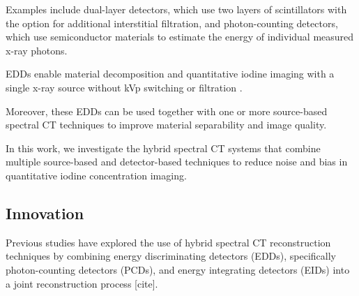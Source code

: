 \documentclass[12pt]{article}
\begin{document}
Examples include dual-layer detectors, which use two layers of scintillators with the option for additional interstitial filtration, and photon-counting detectors, which use semiconductor materials to estimate the energy of individual measured x-ray photons.


EDDs enable material decomposition and quantitative iodine imaging with a single x-ray source without kVp switching or filtration . 


Moreover, these EDDs can be used together with one or more source-based spectral CT techniques to improve material separability and image quality. 


In this work, we investigate the hybrid spectral CT systems that combine multiple source-based and detector-based techniques to reduce noise and bias in quantitative iodine concentration imaging.


\subsection{Innovation}
\label{subsec:intro_innovation}





Previous studies have explored the use of hybrid spectral CT reconstruction techniques by combining energy discriminating detectors (EDDs), specifically photon-counting detectors (PCDs), and energy integrating detectors (EIDs) into a joint reconstruction process [cite].


\end{document}
